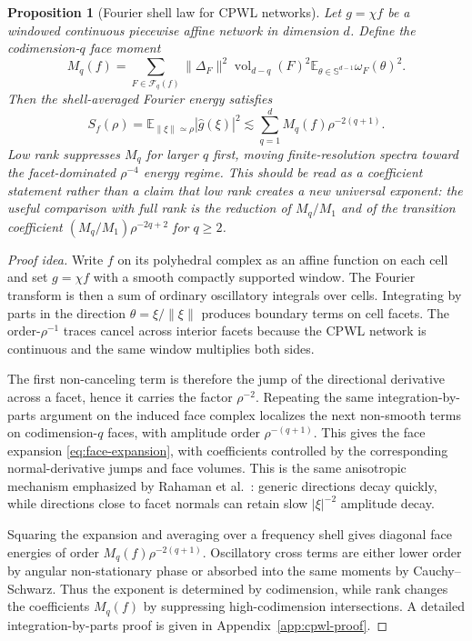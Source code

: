 \documentclass{article}
\newtheorem{proposition}[theorem]{Proposition}
\newcommand{\E}{\mathbb{E}}
\newcommand{\wh}{\widehat}
\begin{document}
\begin{proposition}[Fourier shell law for CPWL networks]
\label{prop:shell-law}
Let $g=\chi f$ be a windowed continuous piecewise affine network in dimension $d$. Define the codimension-$q$ face moment
\begin{equation}
M_q(f)=
\sum_{F\in\mathcal F_q(f)}
\|\Delta_F\|^2
\operatorname{vol}_{d-q}(F)^2
\E_{\theta\in\mathbb S^{d-1}}\omega_F(\theta)^2 .
\end{equation}
Then the shell-averaged Fourier energy satisfies
\begin{equation}
S_f(\rho)=\E_{\|\xi\|\simeq \rho}|\wh g(\xi)|^2
\lesssim
\sum_{q=1}^d M_q(f)\rho^{-2(q+1)}.
\label{eq:shell-law}
\end{equation}
Low rank suppresses $M_q$ for larger $q$ first, moving finite-resolution spectra toward the facet-dominated $\rho^{-4}$ energy regime. This should be read as a coefficient statement rather than a claim that low rank creates a new universal exponent: the useful comparison with full rank is the reduction of $M_q/M_1$ and of the transition coefficient $(M_q/M_1)\rho^{-2q+2}$ for $q\ge2$.
\end{proposition}

\begin{proof}[Proof idea]
Write $f$ on its polyhedral complex as an affine function on each cell and set $g=\chi f$ with a smooth compactly supported window. The Fourier transform is then a sum of ordinary oscillatory integrals over cells. Integrating by parts in the direction $\theta=\xi/\|\xi\|$ produces boundary terms on cell facets. The order-$\rho^{-1}$ traces cancel across interior facets because the CPWL network is continuous and the same window multiplies both sides.

The first non-canceling term is therefore the jump of the directional derivative across a facet, hence it carries the factor $\rho^{-2}$. Repeating the same integration-by-parts argument on the induced face complex localizes the next non-smooth terms on codimension-$q$ faces, with amplitude order $\rho^{-(q+1)}$. This gives the face expansion \eqref{eq:face-expansion}, with coefficients controlled by the corresponding normal-derivative jumps and face volumes. This is the same anisotropic mechanism emphasized by Rahaman et al.~\citep{rahaman2019}: generic directions decay quickly, while directions close to facet normals can retain slow $|\xi|^{-2}$ amplitude decay.

Squaring the expansion and averaging over a frequency shell gives diagonal face energies of order $M_q(f)\rho^{-2(q+1)}$. Oscillatory cross terms are either lower order by angular non-stationary phase or absorbed into the same moments by Cauchy--Schwarz. Thus the exponent is determined by codimension, while rank changes the coefficients $M_q(f)$ by suppressing high-codimension intersections. A detailed integration-by-parts proof is given in Appendix~\ref{app:cpwl-proof}.
\end{proof}
\end{document}

